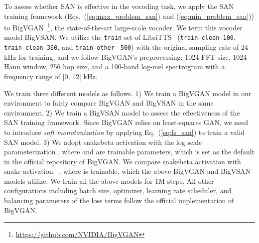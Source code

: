 \documentclass{article}
\def\beqref#1{(\ref{#1})}
\begin{document}
To assess whether SAN is effective in the vocoding task, we apply the SAN training framework (Eqs.~\beqref{eq:max_problem_san} and \beqref{eq:min_problem_san}) to BigVGAN~\cite{lee2023bigvgan}\footnote{\url{https://github.com/NVIDIA/BigVGAN}}, the state-of-the-art large-scale vocoder. We term this vocoder model BigVSAN. We utilize the \texttt{train} set of LibriTTS~\cite{zen2019libritts} (\texttt{train-clean-100}, \texttt{train-clean-360}, and \texttt{train-other-} \texttt{500}) with the original sampling rate of 24 kHz for training, and we follow BigVGAN's preprocessing: 1024 FFT size, 1024 Hann window, 256 hop size, and a 100-band log-mel spectrogram with a frequency range of [0, 12] kHz.

We train three different models as follows. 1) We train a BigVGAN model in our environment to fairly compare BigVGAN and BigVSAN in the same environment. 2) We train a BigVSAN model to assess the effectiveness of the SAN training framework. Since BigVGAN relies on least-squares GAN, we need to introduce \textit{soft monotonization} by applying Eq.~\beqref{eq:ls_san} to train a valid SAN model. 3) We adopt snakebeta activation with the log scale parameterization , where  and  are trainable parameters, which is set as the default in the official repository of BigVGAN. We compare snakebeta activation with snake activation~\cite{ziyin2020neural} , where  is trainable, which the above BigVGAN and BigVSAN models utilize. We train all the above models for 1M steps. All other configurations including batch size, optimizer, learning rate scheduler, and balancing parameters of the loss terms follow the official implementation of BigVGAN.
\end{document}
